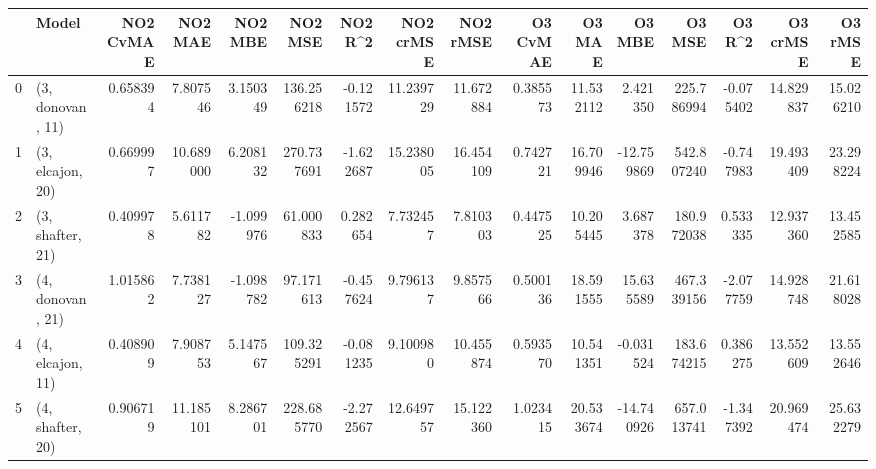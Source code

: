 \begin{tabular}{llrrrrrrrrrrrrrr}
\toprule
{} &             Model &  NO2 CvMAE &    NO2 MAE &   NO2 MBE &     NO2 MSE &   NO2 R\textasciicircum2 &  NO2 crMSE &   NO2 rMSE &  O3 CvMAE &     O3 MAE &     O3 MBE &      O3 MSE &    O3 R\textasciicircum2 &   O3 crMSE &    O3 rMSE \\
\midrule
0 &  (3, donovan, 11) &   0.658394 &   7.807546 &  3.150349 &  136.256218 & -0.121572 &  11.239729 &  11.672884 &  0.385573 &  11.532112 &   2.421350 &  225.786994 & -0.075402 &  14.829837 &  15.026210 \\
1 &  (3, elcajon, 20) &   0.669997 &  10.689000 &  6.208132 &  270.737691 & -1.622687 &  15.238005 &  16.454109 &  0.742721 &  16.709946 & -12.759869 &  542.807240 & -0.747983 &  19.493409 &  23.298224 \\
2 &  (3, shafter, 21) &   0.409978 &   5.611782 & -1.099976 &   61.000833 &  0.282654 &   7.732457 &   7.810303 &  0.447525 &  10.205445 &   3.687378 &  180.972038 &  0.533335 &  12.937360 &  13.452585 \\
3 &  (4, donovan, 21) &   1.015862 &   7.738127 & -1.098782 &   97.171613 & -0.457624 &   9.796137 &   9.857566 &  0.500136 &  18.591555 &  15.635589 &  467.339156 & -2.077759 &  14.928748 &  21.618028 \\
4 &  (4, elcajon, 11) &   0.408909 &   7.908753 &  5.147567 &  109.325291 & -0.081235 &   9.100980 &  10.455874 &  0.593570 &  10.541351 &  -0.031524 &  183.674215 &  0.386275 &  13.552609 &  13.552646 \\
5 &  (4, shafter, 20) &   0.906719 &  11.185101 &  8.286701 &  228.685770 & -2.272567 &  12.649757 &  15.122360 &  1.023415 &  20.533674 & -14.740926 &  657.013741 & -1.347392 &  20.969474 &  25.632279 \\
\bottomrule
\end{tabular}
